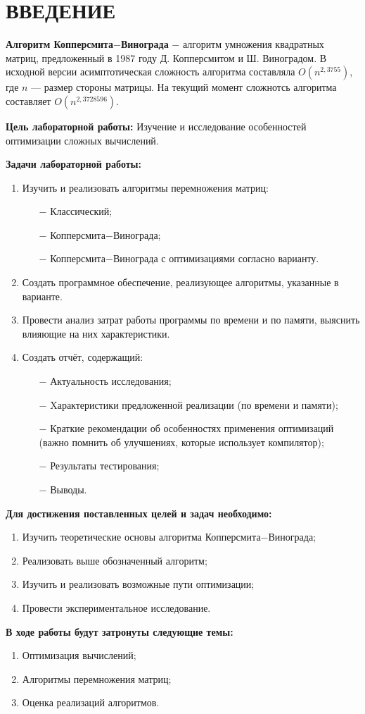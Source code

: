 \chapter*{ВВЕДЕНИЕ}

\textbf{Алгоритм Копперсмита$-$Винограда}\cite{winograd} $-$ алгоритм умножения квадратных матриц, предложенный в 1987 году Д. Копперсмитом и Ш. Виноградом.
В исходной версии асимптотическая сложность алгоритма составляла $O(n^{2,3755})$, где  $n$ — размер стороны матрицы.
На текущий момент сложнотсь алгоритма составляет $O(n^{2,3728596})$.

\textbf{Цель лабораторной работы:}
Изучение и исследование особенностей оптимизации сложных вычислений.

\textbf{Задачи лабораторной работы:}
\begin{enumerate}
\item Изучить и реализовать алгоритмы перемножения матриц:
\begin{enumerate}
    \item[$-$] Классический;
    \item[$-$] Копперсмита$-$Винограда;
    \item[$-$] Копперсмита$-$Винограда с оптимизациями согласно варианту.
\end{enumerate}
\item Создать программное обеспечение, реализующее алгоритмы, указанные в варианте.
\item Провести анализ затрат работы программы по времени и по памяти, выяснить влияющие на них характеристики.
    \item Создать отчёт, содержащий:
    \begin{enumerate}
        \item[$-$] Актуальность исследования;
        \item[$-$] Xарактеристики предложенной реализации (по времени и памяти);
        \item[$-$] Краткие рекомендации об особенностях применения оптимизаций (важно помнить об улучшениях, которые использует компилятор);
        \item[$-$] Результаты тестирования;
        \item[$-$] Выводы.
    \end{enumerate}
\end{enumerate}
\newpage
\textbf{Для достижения поставленных целей и задач необходимо:}
\begin{enumerate}
    \item Изучить теоретические основы алгоритма Копперсмита$-$Винограда;
    \item Реализовать выше обозначенный алгоритм;
    \item Изучить и реализовать возможные пути оптимизации;
    \item Провести экспериментальное исследование.
\end{enumerate}

\textbf{В ходе работы будут затронуты следующие темы:}
\begin{enumerate}
    \item Оптимизация вычислений;
    \item Алгоритмы перемножения матриц;
    \item Оценка реализаций алгоритмов.
\end{enumerate}
